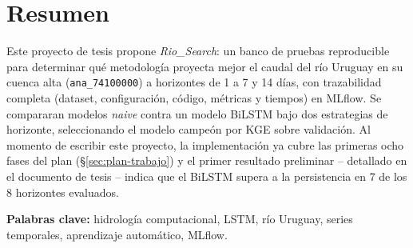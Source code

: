 \documentclass{../common/riosearch}
\begin{document}
\makeriosearchcover

\tableofcontents
\newpage

\section*{Resumen}

Este proyecto de tesis propone \emph{Rio\_Search}: un banco de pruebas reproducible para
determinar qu\'e metodolog\'ia proyecta mejor el caudal del r\'io Uruguay en su cuenca alta
(\texttt{ana\_74100000}) a horizontes de 1 a 7 y 14 d\'ias, con trazabilidad completa (dataset,
configuraci\'on, c\'odigo, m\'etricas y tiempos) en MLflow. Se compararan modelos \emph{naive}
contra un modelo BiLSTM bajo dos estrategias de horizonte, seleccionando el modelo campe\'on por
KGE sobre validaci\'on. Al momento de escribir este proyecto, la implementaci\'on ya cubre las
primeras ocho fases del plan (\S\ref{sec:plan-trabajo}) y el primer resultado preliminar --
detallado en el documento de tesis -- indica que el BiLSTM supera a la persistencia en 7 de los 8
horizontes evaluados.

\textbf{Palabras clave:} hidrolog\'ia computacional, LSTM, r\'io Uruguay, series temporales,
aprendizaje autom\'atico, MLflow.

\newpage






\cleardoublepage
\riosearchbibliography
\end{document}
